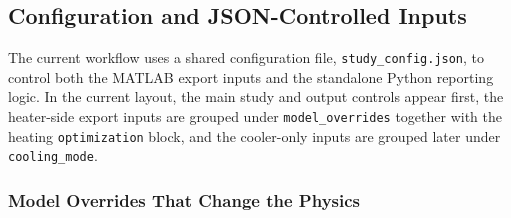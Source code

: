 \documentclass{article}
\begin{document}
\subsection{Configuration and JSON-Controlled Inputs}

The current workflow uses a shared configuration file,
\texttt{study\_config.json}, to control both the MATLAB export inputs and the
standalone Python reporting logic. In the current layout, the main study and
output controls appear first, the heater-side export inputs are grouped under
\texttt{model\_overrides} together with the heating \texttt{optimization}
block, and the cooler-only inputs are grouped later under
\texttt{cooling\_mode}.

\subsubsection{Model Overrides That Change the Physics}
\end{document}

